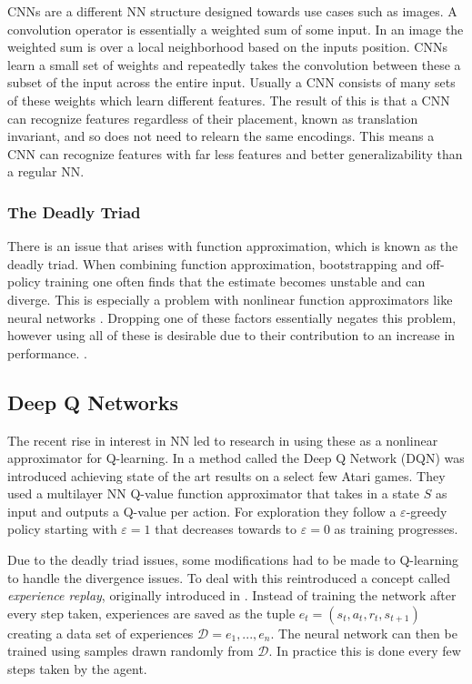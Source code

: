 CNNs are a different NN structure designed towards use cases such as images.  A convolution operator is essentially a weighted sum of some input. In an image the weighted sum is over a local neighborhood based on the inputs position. CNNs learn a small set of weights and repeatedly takes the convolution between these a subset of the input across the entire input. Usually a CNN consists of many sets of these weights which learn different features. The result of this is that a CNN can recognize features regardless of their placement, known as translation invariant, and so does not need to relearn the same encodings. This means a CNN can recognize features with far less features and better generalizability than a regular NN.

\subsubsection{The Deadly Triad}

There is an issue that arises with function approximation, which is known as the deadly triad. When combining function approximation, bootstrapping and off-policy training one often finds that the estimate becomes unstable and can diverge. This is especially a problem with nonlinear function approximators like neural networks \citep{mnih_2013}. Dropping one of these factors essentially negates this problem, however using all of these is desirable due to their contribution to an increase in performance. \cite[p.~264-265]{sutton_barto_2018}.

\subsection{Deep Q Networks}

The recent rise in interest in NN led to research in using these as a nonlinear approximator for Q-learning. In \cite{mnih_2013} a method called the Deep Q Network (DQN) was introduced achieving state of the art results on a select few Atari games. They used a multilayer NN Q-value function approximator that takes in a state $S$ as input and outputs a Q-value per action. For exploration they follow a $\varepsilon$-greedy policy starting with $\varepsilon=1$ that decreases towards to $\varepsilon=0$ as training progresses.

Due to the deadly triad issues, some modifications had to be made to Q-learning to handle the divergence issues. To deal with this \cite{mnih_2013} reintroduced a concept called \textit{experience replay}, originally introduced in \cite{lin_1993}. Instead of training the network after every step taken, experiences are saved as the tuple $e_t=(s_t, a_t,r_t, s_{t+1})$ creating a data set of experiences $\mathcal{D} = e_1,...,e_n$. The neural network can then be trained using samples drawn randomly from $\mathcal{D}$. In practice this is done every few steps taken by the agent.

